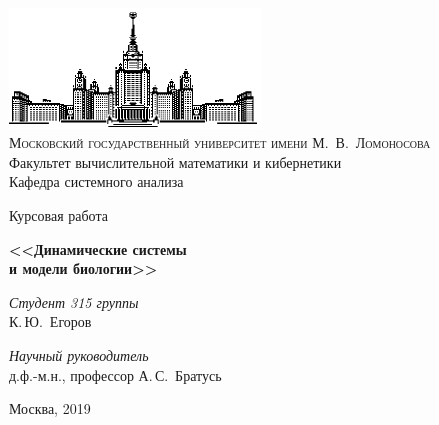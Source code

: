 \thispagestyle{empty}
\begin{center}
    \ \vspace{-3cm}

    \includegraphics[width=0.5\textwidth]{title_page/msu.eps}\\

    {\scshape Московский государственный университет имени М.~В.~Ломоносова}\\
    Факультет вычислительной математики и кибернетики\\
    Кафедра системного анализа

    \vfill

    {\LARGE Курсовая работа}

    \vspace{1cm}
    {\Huge\bfseries <<Динамические системы\\и модели биологии>>}
\end{center}

\vspace{3cm}

\begin{flushright}
    \large
    \textit{Студент 315 группы}\\
    К.\,Ю.~Егоров

    \vspace{5mm}

    \textit{Научный руководитель}\\
    д.ф.-м.н., профессор А.\,С.~Братусь
\end{flushright}

\vfill

\begin{center}
    Москва, 2019
\end{center}

\clearpage